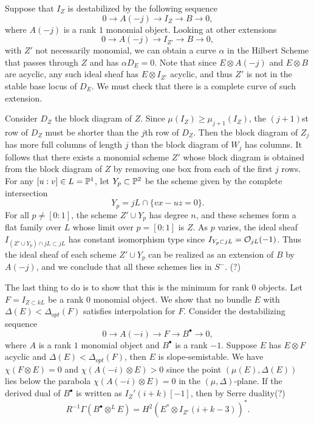 \documentclass[
	oldfontcommands,
	sumario=abnt-6027-2012,
	12pt,			%
	openright,		%
	oneside,		%
	a4paper,		%
	english,		%
	brazil			%
	]{imecc-unicamp}
\begin{document}
Suppose that $I_Z$ is destabilized by the following sequence $$
0\rightarrow A(-j)\rightarrow I_{Z}\rightarrow B\rightarrow 0,
$$
where $A(-j)$ is a rank $1$ monomial object. Looking at other extensions $$
0\rightarrow A(-j)\rightarrow I_{Z'}\rightarrow B\rightarrow 0,
$$
with $Z'$ not necessarily monomial, we can obtain a curve $\alpha$ in the Hilbert Scheme that passes through $Z$ and has $\alpha D_E=0$. Note that since $E\otimes A(-j)$ and $E\otimes B$ are acyclic, any such ideal sheaf has $E\otimes I_{Z'}$ acyclic, and thus $Z'$ is not in the stable base locus of $D_E$. We must check that there is a complete curve of such extension.

Consider $D_Z$ the block diagram of $Z$. Since $\mu(I_Z)\geq \mu_{j+1}(I_Z)$, the $(j+1)$st row of $D_Z$ must be shorter than the $j$th row of $D_Z$. Then the block diagram of $Z_j$ has more full columns of length $j$ than the block diagram of $W_j$ has columns. It follows that there exists a monomial scheme $Z'$ whose block diagram is obtained from the block diagram of $Z$ by removing one box from each of the first $j$ rows. For any $[u:v]\in L={\mathbb P}^1$, let $Y_p\subset {\mathbb P}^2$ be the scheme given by the complete intersection $$
Y_p=jL\cap \{vx-uz=0  \}.
$$
For all $p\neq [0:1]$, the scheme $Z'\cup Y_p$ has degree $n$, and these schemes form a flat family over $L$ whose limit over $p=[0:1]$ is $Z$. As $p$ varies, the ideal sheaf $I_{(Z'\cup Y_p)\cap jL\subset jL}$ has constant isomorphism type since $I_{Y_p\subset jL}={\mathcal O}_{jL}(-1)$. Thus the ideal sheaf of each scheme $Z'\cup Y_p$ can be realized as an extension of $B$ by $A(-j)$, and we conclude that all these schemes lies in $S^-$. (?)



The last thing to do is to show that this is the minimum for rank $0$ objects. Let $F=I_{Z\subset kL}$ be a rank $0$ monomial object. We show that no bundle $E$ with $\Delta(E)<\Delta_{opt}(F)$ satisfies interpolation for $F$. Consider the destabilizing sequence $$
0\rightarrow A(-i)\rightarrow F\rightarrow B^\bullet\rightarrow0,
$$	
where $A$ is a rank $1$ monomial object and $B^\bullet$ is a rank $-1$. Suppose $E$ has $E\otimes F$ acyclic and $\Delta(E)<\Delta_{opt}(F)$, then $E$ is slope-semistable. We have $\chi(F\otimes E)=0$ and $\chi(A(-i)\otimes E)>0$ since the point $(\mu(E),\Delta(E))$ lies below the parabola $\chi(A(-i)\otimes E)=0$ in the $(\mu,\Delta)$-plane. If the derived dual of $B^\bullet$ is written as $I_Z'(i+k)[-1]$, then by Serre duality(?) $$
R^{-1}\Gamma(B^\bullet \otimes^L E)=H^2(E^*\otimes I_{Z'}(i+k-3))^*.
$$
\end{document}
